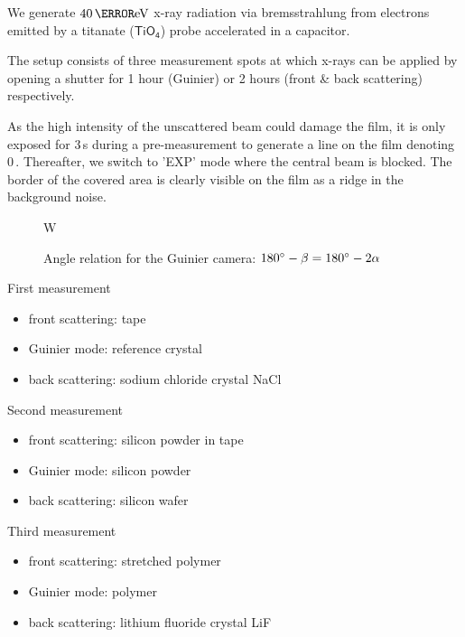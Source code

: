 
We generate $40\,\keV$ x-ray radiation via bremsstrahlung from electrons emitted by a titanate ($\mathsf{TiO_4}$) probe accelerated in a capacitor.

The setup consists of three measurement spots at which x-rays can be applied by opening a shutter for 1 hour (Guinier) or 2 hours (front \& back scattering) respectively.



As the high intensity of the unscattered beam could damage the film, it is only exposed for 3\,s during a pre-measurement to generate a line on the film denoting 0\,\degree. Thereafter, we switch to 'EXP' mode where the central beam is blocked. The border of the covered area is clearly visible on the film as a ridge in the background noise.



\begin{figure}[h]
	\centering
	\vspace{1ex}
	\def\svgwidth{0.5\textwidth}
W	
	\caption{Angle relation for the Guinier camera: $180\degree - \beta = 180\degree - 2 \alpha$}
	\label{fig:guinier_geom}
\end{figure}






First measurement
\begin{itemize}\itemsep-5pt
	\item front scattering: tape
	\item Guinier mode: reference crystal
	\item back scattering: sodium chloride crystal \textsf{NaCl}
\end{itemize}

Second measurement
\begin{itemize}\itemsep-5pt
	\item front scattering: silicon powder in tape
	\item Guinier mode: silicon powder
	\item back scattering: silicon wafer
\end{itemize}

Third measurement
\begin{itemize}\itemsep-5pt
	\item front scattering: stretched polymer
	\item Guinier mode: polymer
	\item back scattering: lithium fluoride crystal \textsf{LiF}
\end{itemize}


